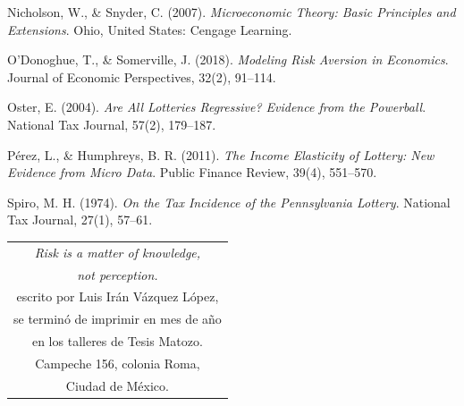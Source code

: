 \documentclass[11pt, oneside]{book}
\begin{document}
\begin{thebibliography}{111}
 Nicholson, W., \& Snyder, C. (2007). \textit{Microeconomic Theory: Basic Principles and Extensions}. Ohio, United States: Cengage Learning.

 O’Donoghue, T., \& Somerville, J. (2018). \textit{Modeling Risk Aversion in Economics}. Journal of Economic Perspectives, 32(2), 91–114.

 Oster, E. (2004). \textit{Are All Lotteries Regressive? Evidence from the Powerball}. National Tax Journal, 57(2), 179–187.

 Pérez, L., \& Humphreys, B. R. (2011). \textit{The Income Elasticity of Lottery: New Evidence from Micro Data}. Public Finance Review, 39(4), 551–570. 

 Spiro, M. H. (1974). \textit{On the Tax Incidence of the Pennsylvania Lottery}. National Tax Journal, 27(1), 57–61. 


































\end{thebibliography}

\newpage
\thispagestyle{empty}
\begin{table}[p]
\centering
\small
\label{ed}
\begin{tabular}{c}
\textit{Risk is a matter of knowledge,}\\ \textit{not perception.}\\
escrito por Luis Irán Vázquez López,\\ se terminó de imprimir en mes de año\\ en los talleres de Tesis Matozo.\\ Campeche 156, colonia Roma,\\ Ciudad de México.
\end{tabular}
\end{table}


\end{document}

